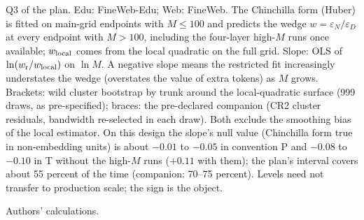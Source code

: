 \begin{table}[tp]
\begin{tablenotes}
Q3 of the plan. Edu: FineWeb-Edu; Web: FineWeb. The Chinchilla form (Huber) is fitted on main-grid endpoints with $M\le100$ and predicts the wedge $w=\varepsilon_N/\varepsilon_D$ at every endpoint with $M>100$, including the four-layer high-$M$ runs once available; $w_{\rm local}$ comes from the local quadratic on the full grid. Slope: OLS of $\ln(w_{\rm r}/w_{\rm local})$ on $\ln M$. A negative slope means the restricted fit increasingly understates the wedge (overstates the value of extra tokens) as $M$ grows. Brackets: wild cluster bootstrap by trunk around the local-quadratic surface (999 draws, as pre-specified); braces: the pre-declared companion (CR2 cluster residuals, bandwidth re-selected in each draw). Both exclude the smoothing bias of the local estimator. On this design the slope's null value (Chinchilla form true in non-embedding units) is about $-0.01$ to $-0.05$ in convention P and $-0.08$ to $-0.10$ in T without the high-$M$ runs ($+0.11$ with them); the plan's interval covers about 55 percent of the time (companion: 70--75 percent). Levels need not transfer to production scale; the sign is the object.
\end{tablenotes}

\begin{tablenotes}[Source]
Authors' calculations.
\end{tablenotes}
\end{table}
